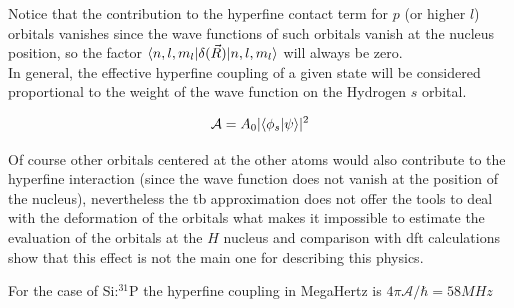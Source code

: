 Notice that the contribution to the hyperfine contact term for $p$ (or higher $l$) orbitals vanishes since the wave functions of such orbitals vanish at the nucleus position, so the factor $\langle n,l,m_{l}|\delta(\vec{R})|n,l,m_{l}\rangle$ will always be zero.\\

In general, the effective hyperfine coupling of a given state will be considered proportional to the weight of the wave function on the Hydrogen $s$ orbital.

\begin{equation}
  \mathcal{A} = A_0|\langle\phi_s|\psi\rangle|^2
\end{equation}

Of course other orbitals centered at the other atoms would also contribute to the hyperfine interaction (since the wave function does not vanish at the position of the nucleus), nevertheless the \ac{tb} approximation does not offer the tools to deal with the deformation of the orbitals what makes it impossible to estimate the evaluation of the orbitals at the $H$ nucleus and comparison with \ac{dft} calculations show that this effect is not the main one for describing this physics.

For the case of Si:$^{31}$P the hyperfine coupling in MegaHertz is $4\pi\mathcal{A}/\hbar=58MHz$


